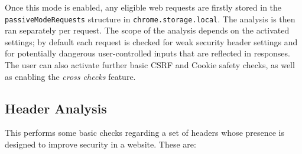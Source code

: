 Once this mode is enabled, any eligible web requests are firstly stored in the \texttt{passiveModeRequests} structure in \texttt{chrome.storage.local}. The analysis is then ran separately per request. The scope of the analysis depends on the activated settings; by default each request is checked for weak security header settings and for potentially dangerous user-controlled inputs that are reflected in responses. The user can also activate further basic CSRF and Cookie safety checks, as well as enabling the \textit{cross checks} feature. 




\subsection{Header Analysis} \label{header_analysis}

This performs some basic checks regarding a set of headers whose presence is designed to improve security in a website. These are:

